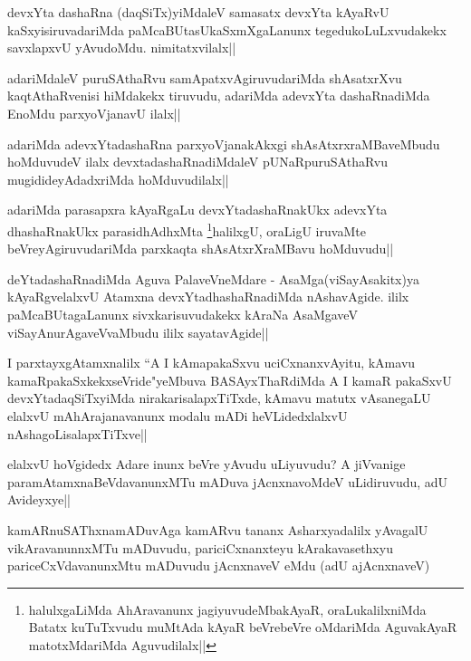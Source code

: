 
\begin{artha}
devxYta dashaRna (daqSiTx)yiMdaleV samasatx devxYta kAyaRvU kaSxyisiruvadariMda paMcaBUtasUkaSxmXgaLanunx tegedukoLuLxvudakekx savxlapxvU yAvudoMdu. nimitatxvilalx||
\end{artha}

\begin{artha}
adariMdaleV puruSAthaRvu samApatxvAgiruvudariMda shAsatxrXvu kaqtAthaRvenisi hiMdakekx tiruvudu, adariMda adevxYta dashaRnadiMda EnoMdu parxyoVjanavU ilalx||
\end{artha}

\begin{artha}
adariMda adevxYtadashaRna parxyoVjanakAkxgi shAsAtxrxraMBaveMbudu hoMduvudeV ilalx devxtadashaRnadiMdaleV pUNaRpuruSAthaRvu mugidideyAdadxriMda hoMduvudilalx||
\end{artha}

\begin{artha}
adariMda parasapxra kAyaRgaLu devxYtadashaRnakUkx adevxYta dhashaRnakUkx parasidhAdhxMta 
\footnote{halulxgaLiMda AhAravanunx jagiyuvudeMbakAyaR, oraLukalilxniMda Batatx kuTuTxvudu muMtAda kAyaR beVrebeVre oMdariMda AguvakAyaR matotxMdariMda Aguvudilalx||}halilxgU, oraLigU iruvaMte beVreyAgiruvudariMda parxkaqta shAsAtxrXraMBavu hoMduvudu||
\end{artha}

\begin{artha}
deYtadashaRnadiMda Aguva PalaveVneMdare - AsaMga(viSayAsakitx)ya kAyaRgvelalxvU Atamxna  devxYtadhashaRnadiMda nAshavAgide. ililx paMcaBUtagaLanunx sivxkarisuvudakekx kAraNa AsaMgaveV viSayAnurAgaveVvaMbudu ililx sayatavAgide||
\end{artha}

\begin{artha}
I parxtayxgAtamxnalilx ``A I kAmapakaSxvu uciCxnanxvAyitu, kAmavu kamaRpakaSxkekxseVride"yeMbuva BASAyxThaRdiMda A I kamaR pakaSxvU devxYtadaqSiTxyiMda nirakarisalapxTiTxde, kAmavu matutx vAsanegaLU elalxvU mAhArajanavanunx modalu mADi heVLidedxlalxvU nAshagoLisalapxTiTxve||
\end{artha}

\begin{artha}
elalxvU hoVgidedx Adare inunx beVre yAvudu uLiyuvudu? A jiVvanige paramAtamxnaBeVdavanunxMTu  mADuva jAcnxnavoMdeV uLidiruvudu, adU Avideyxye||
\end{artha}

\begin{artha}
kamARnuSAThxnamADuvAga kamARvu tananx Asharxyadalilx yAvagalU vikAravanunnxMTu mADuvudu, pariciCxnanxteyu kArakavasethxyu pariceCxVdavanunxMtu mADuvudu jAcnxnaveV eMdu (adU ajAcnxnaveV)
\end{artha}


